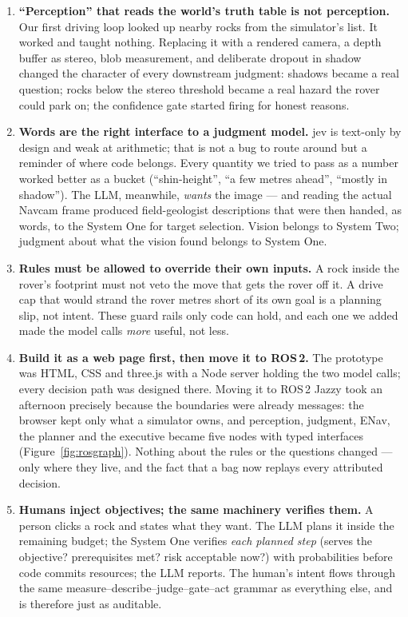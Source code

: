 \documentclass[11pt]{article}
\begin{document}
\begin{enumerate}
\item \textbf{``Perception'' that reads the world's truth table is not perception.} Our first driving loop looked up nearby rocks from the simulator's list. It worked and taught nothing. Replacing it with a rendered camera, a depth buffer as stereo, blob measurement, and deliberate dropout in shadow changed the character of every downstream judgment: shadows became a real question; rocks below the stereo threshold became a real hazard the rover could park on; the confidence gate started firing for honest reasons.
\item \textbf{Words are the right interface to a judgment model.} jev is text-only by design and weak at arithmetic; that is not a bug to route around but a reminder of where code belongs. Every quantity we tried to pass as a number worked better as a bucket (``shin-height'', ``a few metres ahead'', ``mostly in shadow''). The LLM, meanwhile, \emph{wants} the image --- and reading the actual Navcam frame produced field-geologist descriptions that were then handed, as words, to the System One for target selection. Vision belongs to System Two; judgment about what the vision found belongs to System One.
\item \textbf{Rules must be allowed to override their own inputs.} A rock inside the rover's footprint must not veto the move that gets the rover off it. A drive cap that would strand the rover metres short of its own goal is a planning slip, not intent. These guard rails only code can hold, and each one we added made the model calls \emph{more} useful, not less.
\item \textbf{Build it as a web page first, then move it to ROS\,2.} The prototype was HTML, CSS and three.js with a Node server holding the two model calls; every decision path was designed there. Moving it to ROS\,2 Jazzy took an afternoon precisely because the boundaries were already messages: the browser kept only what a simulator owns, and perception, judgment, ENav, the planner and the executive became five nodes with typed interfaces (Figure~\ref{fig:rosgraph}). Nothing about the rules or the questions changed --- only where they live, and the fact that a bag now replays every attributed decision.
\item \textbf{Humans inject objectives; the same machinery verifies them.} A person clicks a rock and states what they want. The LLM plans it inside the remaining budget; the System One verifies \emph{each planned step} (serves the objective? prerequisites met? risk acceptable now?) with probabilities before code commits resources; the LLM reports. The human's intent flows through the same measure--describe--judge--gate--act grammar as everything else, and is therefore just as auditable.
\end{enumerate}
\end{document}
